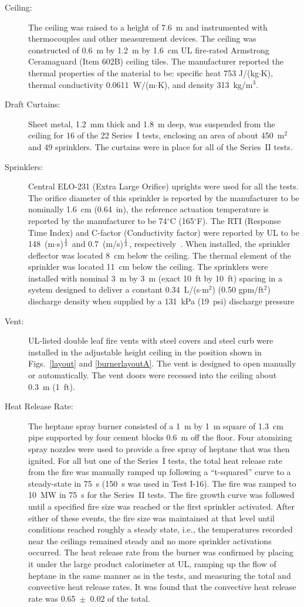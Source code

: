 \begin{description}
\item[Ceiling:] The ceiling was raised to a height of 7.6~m and instrumented with thermocouples and other measurement devices. The ceiling was constructed of 0.6~m by 1.2~m by 1.6~cm UL fire-rated Armstrong Ceramaguard (Item 602B) ceiling tiles. The manufacturer reported the thermal properties of the material to be: specific heat 753 J/(kg$\cdot$K), thermal conductivity 0.0611~W/(m$\cdot$K), and density 313~kg/m$^3$.
\item[Draft Curtains:] Sheet metal, 1.2~mm thick and 1.8~m deep, was suspended from the ceiling for 16 of the 22 Series~I tests, enclosing an area of about 450~m$^2$ and 49 sprinklers. The curtains were in place for all of the Series~II tests.
\item[Sprinklers:] Central ELO-231 (Extra Large Orifice) uprights were used for all the tests. The orifice diameter of this sprinkler is reported by the manufacturer to be nominally 1.6~cm (0.64~in), the reference actuation temperature is reported by the manufacturer to be 74$^\circ$C (165$^\circ$F). The RTI (Response Time Index) and C-factor (Conductivity factor) were reported by UL to be 148~(m$\cdot$s)$^{\frac{1}{2}}$ and 0.7~(m/s)$^{\frac{1}{2}}$, respectively~\cite{Sheppard:1}. When installed, the sprinkler deflector was located 8~cm below the ceiling. The thermal element of the sprinkler was located 11~cm below the ceiling. The sprinklers were installed with nominal 3~m by 3~m (exact 10~ft by 10~ft) spacing in a system designed to deliver a constant 0.34~L/(s$\cdot$m$^2$) (0.50 gpm/ft$^2$) discharge density when supplied by a 131~kPa (19~psi) discharge pressure
\item[Vent:] UL-listed double leaf fire vents with steel covers and steel curb were installed in the adjustable height ceiling in the position shown in Figs.~\ref{layout} and \ref{burnerlayoutA}. The vent is designed to open manually or automatically. The vent doors were recessed into the ceiling about 0.3~m (1~ft).
\item[Heat Release Rate:] The heptane spray burner consisted of a 1~m by 1~m square of 1.3~cm pipe supported by four cement blocks 0.6~m off the floor. Four atomizing spray nozzles were used to provide a free spray of heptane that was then ignited. For all but one of the Series~I tests, the total heat release rate from the fire was manually ramped up following a ``t-squared'' curve to a steady-state in 75~s (150~s was used in Test I-16). The fire was ramped to 10~MW in 75~s for the Series~II tests. The fire growth curve was followed until a specified fire size was reached or the first sprinkler activated. After either of these events, the fire size was maintained at that level until conditions reached roughly a steady state, i.e., the temperatures recorded near the ceilings remained steady and no more sprinkler activations occurred. The heat release rate from the burner was confirmed by placing it under the large product calorimeter at UL, ramping up the flow of heptane in the same manner as in the tests, and measuring the total and convective heat release rates. It was found that the convective heat release rate was 0.65~$\pm$~0.02 of the total.

\end{description}
